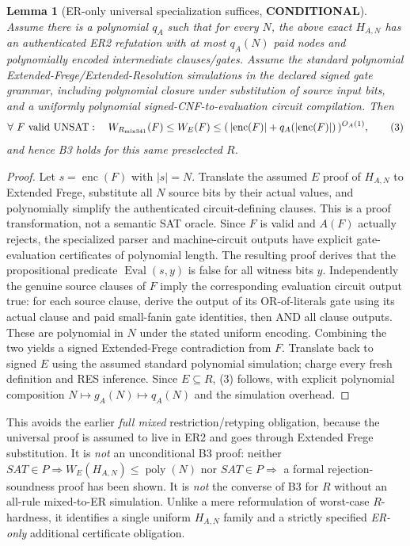 \documentclass[11pt]{article}
\newtheorem{lemma}[theorem]{Lemma}
\begin{document}
\begin{lemma}[ER-only universal specialization suffices, \textbf{CONDITIONAL}]
Assume there is a polynomial $q_A$ such that for \emph{every} $N$, the above exact $H_{A,N}$ has an authenticated ER2 refutation with at most $q_A(N)$ paid nodes and polynomially encoded intermediate clauses/gates. Assume the standard polynomial Extended-Frege/Extended-Resolution simulations in the declared signed gate grammar, including polynomial closure under substitution of source input bits, and a uniformly polynomial signed-CNF-to-evaluation circuit compilation. Then
\[
 \forall\ F\ {\rm valid\ UNSAT}:\quad
 W_{R_{\mathrm{mix341}}}(F)
 \le W_E(F)\le (\,|{\rm enc}(F)|+q_A(|{\rm enc}(F)|)\,)^{O_A(1)},
 \tag{3}
\]
and hence B3 holds for this \emph{same} preselected $R$.
\end{lemma}
\begin{proof}
Let $s=\operatorname{enc}(F)$ with $|s|=N$. Translate the assumed $E$ proof of $H_{A,N}$ to Extended Frege, substitute all $N$ source bits by their actual values, and polynomially simplify the authenticated circuit-defining clauses. This is a proof transformation, not a semantic SAT oracle. Since $F$ is valid and $A(F)$ actually rejects, the specialized parser and machine-circuit outputs have explicit gate-evaluation certificates of polynomial length. The resulting proof derives that the propositional predicate $\operatorname{Eval}(s,y)$ is false for all witness bits $y$. Independently the genuine source clauses of $F$ imply the corresponding evaluation circuit output true: for each source clause, derive the output of its OR-of-literals gate using its actual clause and paid small-fanin gate identities, then AND all clause outputs. These are polynomial in $N$ under the stated uniform encoding. Combining the two yields a signed Extended-Frege contradiction from $F$. Translate back to signed $E$ using the assumed standard polynomial simulation; charge every fresh definition and RES inference. Since $E\subseteq R$, (3) follows, with explicit polynomial composition $N\mapsto g_A(N)\mapsto q_A(N)$ and the simulation overhead.
\end{proof}
\noindent This avoids the earlier \emph{full mixed} restriction/retyping obligation, because the universal proof is assumed to live in ER2 and goes through Extended Frege substitution. It is \emph{not} an unconditional B3 proof: neither $SAT\in P\Rightarrow W_E(H_{A,N})\le\operatorname{poly}(N)$ nor $SAT\in P\Rightarrow$ a formal rejection-soundness proof has been shown. It is \emph{not} the converse of B3 for $R$ without an all-rule mixed-to-ER simulation. Unlike a mere reformulation of worst-case $R$-hardness, it identifies a single uniform $H_{A,N}$ family and a strictly specified \emph{ER-only} additional certificate obligation.
\end{document}
